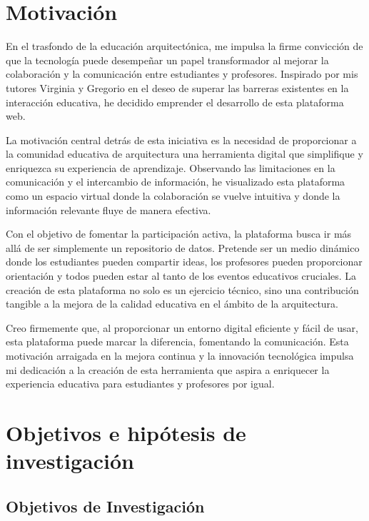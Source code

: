 \documentclass[a4paper, 12pt]{book}
\begin{document}
\section{Motivación}
\label{sec:seccion}


En el trasfondo de la educación arquitectónica, me impulsa la firme convicción de que la tecnología puede desempeñar un papel transformador al mejorar la colaboración y la comunicación entre estudiantes y profesores. Inspirado por mis tutores Virginia y Gregorio en el deseo de superar las barreras existentes en la interacción educativa, he decidido emprender el desarrollo de esta plataforma web.

La motivación central detrás de esta iniciativa es la necesidad de proporcionar a la comunidad educativa de arquitectura una herramienta digital que simplifique y enriquezca su experiencia de aprendizaje. Observando las limitaciones en la comunicación y el intercambio de información, he visualizado esta plataforma como un espacio virtual donde la colaboración se vuelve intuitiva y donde la información relevante fluye de manera efectiva.

Con el objetivo de fomentar la participación activa, la plataforma busca ir más allá de ser simplemente un repositorio de datos. Pretende ser un medio dinámico donde los estudiantes pueden compartir ideas, los profesores pueden proporcionar orientación y todos pueden estar al tanto de los eventos educativos cruciales. La creación de esta plataforma no solo es un ejercicio técnico, sino una contribución tangible a la mejora de la calidad educativa en el ámbito de la arquitectura.

Creo firmemente que, al proporcionar un entorno digital eficiente y fácil de usar, esta plataforma puede marcar la diferencia, fomentando la comunicación. Esta motivación arraigada en la mejora continua y la innovación tecnológica impulsa mi dedicación a la creación de esta herramienta que aspira a enriquecer la experiencia educativa para estudiantes y profesores por igual.
\section{Objetivos e hipótesis de investigación}
\label{sec:seccion}

\subsection{Objetivos de Investigación}
\label{subsec:Objetivos de Investigación}
\end{document}
